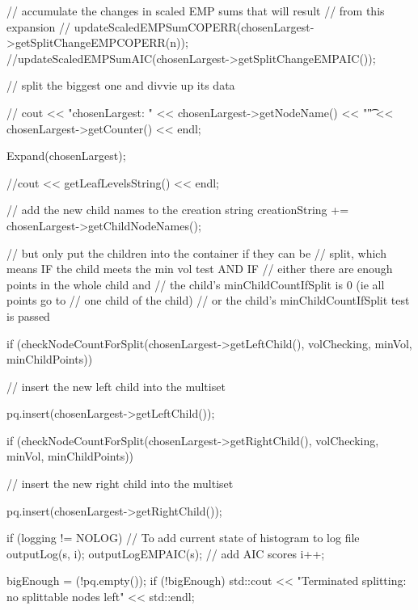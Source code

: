 \begin{DoxyCode}
{{{            // accumulate the changes in scaled EMP sums that will result
            // from this expansion
            //
      updateScaledEMPSumCOPERR(chosenLargest->getSplitChangeEMPCOPERR(n));
            //updateScaledEMPSumAIC(chosenLargest->getSplitChangeEMPAIC());

            // split the biggest one and divvie up its data

          // cout << "chosenLargest: " << chosenLargest->getNodeName() << "\t"
       << chosenLargest->getCounter() << endl;
           
           Expand(chosenLargest);

           
           //cout << getLeafLevelsString() << endl;

            // add the new child names to the creation string
            creationString += chosenLargest->getChildNodeNames();

            // but only put the children into the container if they can be
            // split, which means IF the child meets the min vol test AND IF
            // either there are enough points in the whole child and
                // the child's minChildCountIfSplit is 0 (ie all points go to
                // one child of the child)
            // or the child's minChildCountIfSplit test is passed

            if (checkNodeCountForSplit(chosenLargest->getLeftChild(),
                    volChecking, minVol, minChildPoints)) {
                // insert the new left child into the multiset
                
                pq.insert(chosenLargest->getLeftChild());
            }

            if (checkNodeCountForSplit(chosenLargest->getRightChild(),
                    volChecking, minVol, minChildPoints)) {
                // insert the new right child into the multiset
               
                pq.insert(chosenLargest->getRightChild());
            }

            if (logging != NOLOG) {
                // To add current state of histogram to log file
                outputLog(s, i);
                outputLogEMPAIC(s); // add AIC scores
                i++;
            }

            bigEnough = (!pq.empty());
            if (!bigEnough)
                std::cout << "Terminated splitting: no splittable nodes left"
                    << std::endl;
        
}}}
\end{DoxyCode}
